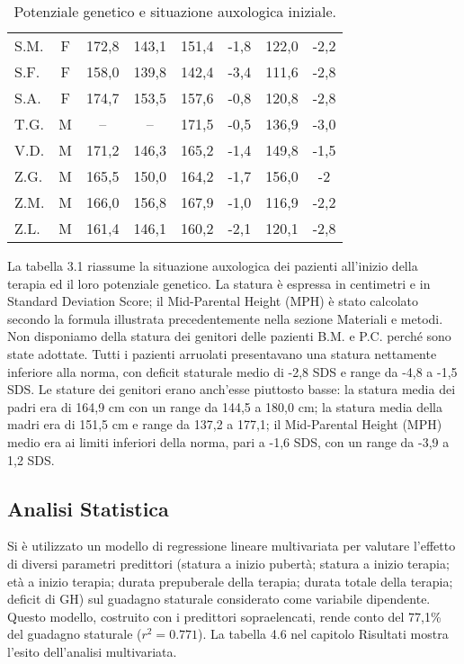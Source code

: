 \begin{table}[!h]
\begin{center}
\begin{tabular}{lccccccc}
S.M.	& F & 172,8 & 143,1 & 151,4 & -1,8 	        	& 122,0 & -2,2  \\
S.F.	& F & 158,0 & 139,8 & 142,4 & -3,4 	  		& 111,6 & -2,8  \\
S.A.	& F & 174,7 & 153,5 & 157,6 & -0,8 	  		& 120,8 & -2,8  \\
T.G.    & M & --    & --    & 171,5 & -0,5    			& 136,9 & -3,0  \\
V.D.	& M & 171,2 & 146,3 & 165,2 & -1,4 	  		& 149,8 & -1,5  \\
Z.G.	& M & 165,5 & 150,0 & 164,2 & -1,7 	  		& 156,0 & -2     \\
Z.M.	& M & 166,0 & 156,8 & 167,9 & -1,0 	  		& 116,9 & -2,2  \\
Z.L.	& M & 161,4 & 146,1 & 160,2 & -2,1 	  		& 120,1 & -2,8  \\
\bottomrule
\end{tabular}
\end{center}
\caption{Potenziale genetico e situazione auxologica iniziale.}
\label{tab:SituazioneIniziale}
\end{table}

La tabella 3.1 riassume la situazione auxologica dei pazienti all'inizio della terapia ed il loro potenziale genetico. La statura è espressa in centimetri e in Standard Deviation Score; il Mid-Parental Height (MPH) è stato calcolato secondo la formula illustrata precedentemente nella sezione Materiali e metodi. Non disponiamo della statura dei genitori delle pazienti B.M. e P.C. perché sono state adottate. Tutti i pazienti arruolati presentavano una statura nettamente inferiore alla norma, con deficit staturale medio di -2,8 SDS e range da -4,8 a -1,5 SDS. Le stature dei genitori erano anch'esse piuttosto basse: la statura media dei padri era di 164,9 cm con un range da 144,5 a 180,0 cm; la statura media della madri era di 151,5 cm e range da 137,2 a 177,1; il Mid-Parental Height (MPH) medio era ai limiti inferiori della norma, pari a -1,6 SDS, con un range da -3,9 a 1,2 SDS.

\subsection{Analisi Statistica}
Si è utilizzato un modello di regressione lineare multivariata per valutare l'effetto di diversi parametri predittori (statura a inizio pubertà; statura a inizio terapia; età a inizio terapia; durata prepuberale della terapia; durata totale della terapia; deficit di GH) sul guadagno staturale considerato come variabile dipendente. 
Questo modello, costruito con i predittori sopraelencati, rende conto del 77,1\% del guadagno staturale ($r^2 = 0.771$).
La tabella 4.6 nel capitolo Risultati mostra l'esito dell'analisi multivariata. 
